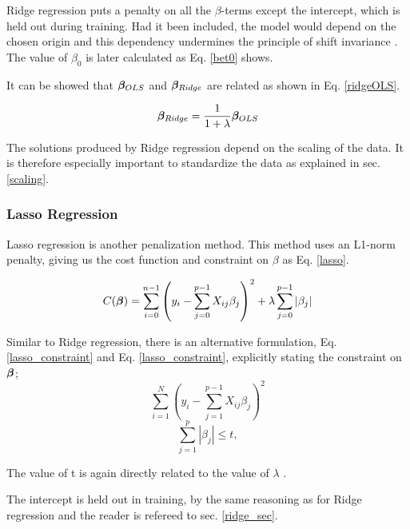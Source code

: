 Ridge regression puts a penalty on all the $\beta$-terms except the intercept, which is held out during training. Had it been included, the model would depend on the chosen origin and this dependency undermines the principle of shift invariance \citep[p. 63]{hastie}.
The value of $\beta_0$ is later calculated as Eq. \ref{bet0} shows. 


It can be showed that $\boldsymbol{\beta}_{OLS}$ and $\boldsymbol{\beta}_{Ridge}$ are related as shown in Eq. \ref{ridgeOLS}. 

\begin{equation}\label{ridgeOLS}
    \boldsymbol{\beta}_{Ridge} = \frac{1}{1+\lambda}\boldsymbol{\beta}_{OLS}
\end{equation}

The solutions produced by Ridge regression depend on the scaling of the data. It is therefore especially important to standardize the data as explained in sec. \ref{scaling}.



\subsubsection{Lasso Regression}

Lasso regression is another penalization method. This method uses an L1-norm penalty, giving us the cost function and constraint on $\beta$ as Eq. \ref{lasso}. 

\begin{equation}\label{lasso}
     C(\boldsymbol{\beta}) = \sum_{i=0}^{n-1} \left( y_i - \sum_{j=0}^{p-1} X_{ij}\beta_j \right)^2 + \lambda\sum_{j=0}^{p-1} |\beta_j|
\end{equation}

Similar to Ridge regression, there is an alternative formulation, Eq. \ref{lasso_constraint} and Eq. \ref{lasso_constraint}, explicitly stating the constraint on $\boldsymbol{\beta}$;
\begin{equation}\label{lasso_alt}
    \sum_{i=1}^N \left(y_i - \sum_{j=1}^{p-1} X_{ij}\beta_j \right)^2
\end{equation}
\begin{equation}\label{lasso_constraint}
    \sum_{j=1}^p | \beta_j | \leq t, 
\end{equation}


The value of t is again directly related to the value of $\lambda$ \citep[p. 68]{hastie}.


The intercept is held out in training, by the same reasoning as for Ridge regression and the reader is refereed to sec. \ref{ridge_sec}.


